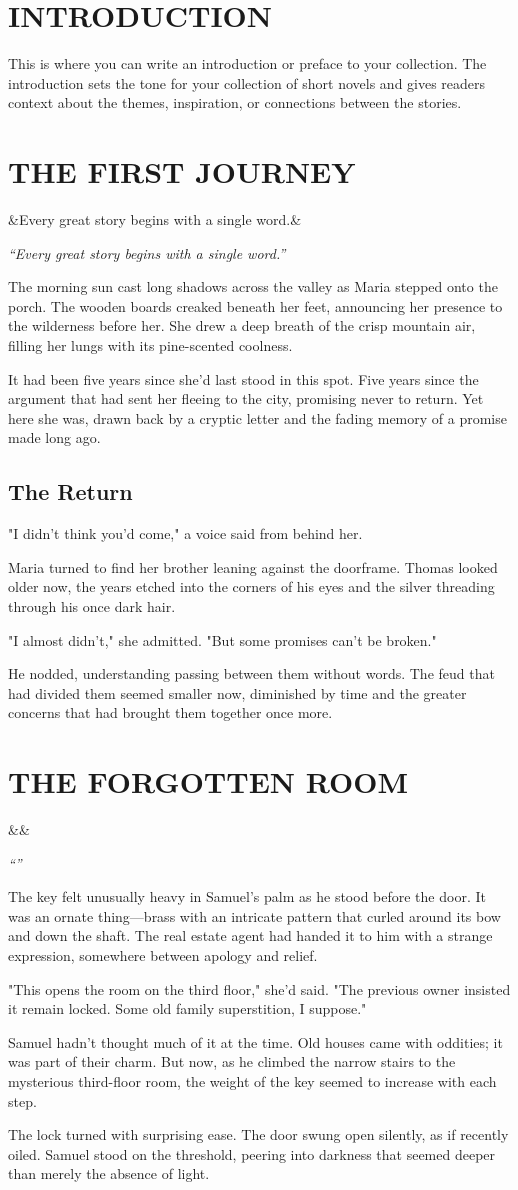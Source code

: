 \documentclass[11pt,oneside,openany]{memoir}
\newcommand{\story}[3][]{
    \clearpage
    \chapter{#2}
    
    \ifx&#1&
    \else
        \begin{center}
            \vspace{-1cm}
            \textit{``#1''}
            \vspace{0.5cm}
        \end{center}
    \fi
    
    #3
}
\begin{document}
\clearpage
\chapter{INTRODUCTION}
This is where you can write an introduction or preface to your collection. The introduction sets the tone for your collection of short novels and gives readers context about the themes, inspiration, or connections between the stories.

\mainmatter

\story[Every great story begins with a single word.]{THE FIRST JOURNEY}{
    The morning sun cast long shadows across the valley as Maria stepped onto the porch. The wooden boards creaked beneath her feet, announcing her presence to the wilderness before her. She drew a deep breath of the crisp mountain air, filling her lungs with its pine-scented coolness.
    
    It had been five years since she'd last stood in this spot. Five years since the argument that had sent her fleeing to the city, promising never to return. Yet here she was, drawn back by a cryptic letter and the fading memory of a promise made long ago.
    
    \section{The Return}
    
    "I didn't think you'd come," a voice said from behind her.
    
    Maria turned to find her brother leaning against the doorframe. Thomas looked older now, the years etched into the corners of his eyes and the silver threading through his once dark hair.
    
    "I almost didn't," she admitted. "But some promises can't be broken."
    
    He nodded, understanding passing between them without words. The feud that had divided them seemed smaller now, diminished by time and the greater concerns that had brought them together once more.
}

\story{THE FORGOTTEN ROOM}{
    The key felt unusually heavy in Samuel's palm as he stood before the door. It was an ornate thing—brass with an intricate pattern that curled around its bow and down the shaft. The real estate agent had handed it to him with a strange expression, somewhere between apology and relief.
    
    "This opens the room on the third floor," she'd said. "The previous owner insisted it remain locked. Some old family superstition, I suppose."
    
    Samuel hadn't thought much of it at the time. Old houses came with oddities; it was part of their charm. But now, as he climbed the narrow stairs to the mysterious third-floor room, the weight of the key seemed to increase with each step.
    
    The lock turned with surprising ease. The door swung open silently, as if recently oiled. Samuel stood on the threshold, peering into darkness that seemed deeper than merely the absence of light.
}
\end{document}
